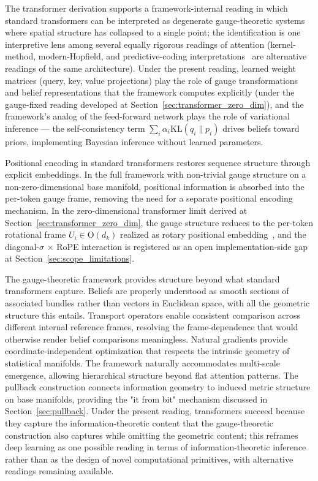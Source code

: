\documentclass[11pt]{article}
\begin{document}
The transformer derivation supports a framework-internal reading in which standard transformers can be interpreted as degenerate gauge-theoretic systems where spatial structure has collapsed to a single point; the identification is one interpretive lens among several equally rigorous readings of attention (kernel-method, modern-Hopfield, and predictive-coding interpretations~\cite{tsai2019transformer, ramsauer2021hopfield, millidge2021predictive} are alternative readings of the same architecture). Under the present reading, learned weight matrices (query, key, value projections) play the role of gauge transformations and belief representations that the framework computes explicitly (under the gauge-fixed reading developed at Section~\ref{sec:transformer_zero_dim}), and the framework's analog of the feed-forward network plays the role of variational inference --- the self-consistency term $\sum_i \alpha_i \mathrm{KL}(q_i \| p_i)$ drives beliefs toward priors, implementing Bayesian inference without learned parameters.

Positional encoding in standard transformers restores sequence structure through explicit embeddings. In the full framework with non-trivial gauge structure on a non-zero-dimensional base manifold, positional information is absorbed into the per-token gauge frame, removing the need for a separate positional encoding mechanism. In the zero-dimensional transformer limit derived at Section~\ref{sec:transformer_zero_dim}, the gauge structure reduces to the per-token rotational frame $U_i \in \mathrm{O}(d_k)$ realized as rotary positional embedding~\cite{su2024roformer}, and the diagonal-$\sigma$ $\times$ RoPE interaction is registered as an open implementation-side gap at Section~\ref{sec:scope_limitations}.

The gauge-theoretic framework provides structure beyond what standard transformers capture. Beliefs are properly understood as smooth sections of associated bundles rather than vectors in Euclidean space, with all the geometric structure this entails. Transport operators enable consistent comparison across different internal reference frames, resolving the frame-dependence that would otherwise render belief comparisons meaningless. Natural gradients provide coordinate-independent optimization that respects the intrinsic geometry of statistical manifolds. The framework naturally accommodates multi-scale emergence, allowing hierarchical structure beyond flat attention patterns. The pullback construction connects information geometry to induced metric structure on base manifolds, providing the "it from bit" mechanism discussed in Section~\ref{sec:pullback}. Under the present reading, transformers succeed because they capture the information-theoretic content that the gauge-theoretic construction also captures while omitting the geometric content; this reframes deep learning as one possible reading in terms of information-theoretic inference rather than as the design of novel computational primitives, with alternative readings remaining available.
\end{document}
